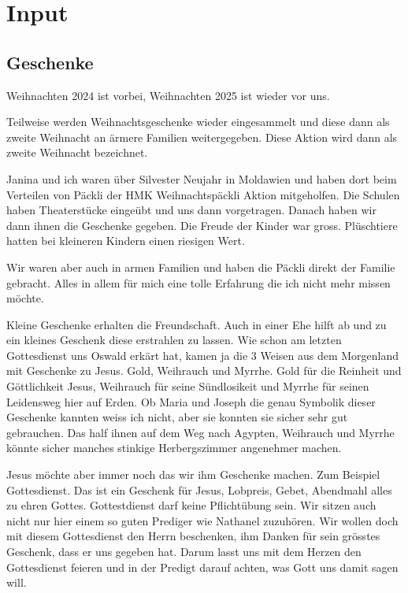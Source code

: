 \section{ Input }
\begin{spacing}{1.5}
\subsection{ Geschenke }

Weihnachten 2024 ist vorbei, Weihnachten 2025 ist wieder vor uns. 

Teilweise werden Weihnachtsgeschenke wieder eingesammelt und diese dann als zweite Weihnacht an ärmere Familien weitergegeben. Diese Aktion wird dann als zweite Weihnacht bezeichnet.

Janina und ich waren über Silvester Neujahr in Moldawien und haben dort beim Verteilen von Päckli der HMK Weihnachtspäckli Aktion mitgeholfen. Die Schulen haben Theaterstücke eingeübt und uns dann vorgetragen. Danach haben wir dann ihnen die Geschenke gegeben. Die Freude der Kinder war gross. Plüschtiere hatten bei kleineren Kindern einen riesigen Wert.

Wir waren aber auch in armen Familien und haben die Päckli direkt der Familie gebracht. Alles in allem für mich eine tolle Erfahrung die ich nicht mehr missen möchte.

Kleine Geschenke erhalten die Freundschaft. Auch in einer Ehe hilft ab und zu ein kleines Geschenk diese erstrahlen zu lassen. Wie schon am letzten Gottesdienst uns Oswald erkärt hat, kamen ja die 3 Weisen aus dem Morgenland mit Geschenke zu Jesus. Gold, Weihrauch und Myrrhe. Gold für die Reinheit und Göttlichkeit Jesus, Weihrauch für seine Sündlosikeit und Myrrhe für seinen Leidensweg hier auf Erden. Ob Maria und Joseph die genau Symbolik dieser Geschenke kannten weiss ich nicht, aber sie konnten sie sicher sehr gut gebrauchen. Das half ihnen auf dem Weg nach Agypten, Weihrauch und Myrrhe könnte sicher manches stinkige Herbergszimmer angenehmer machen.

Jesus möchte aber immer noch das wir ihm Geschenke machen. Zum Beispiel Gottesdienst. Das ist ein Geschenk für Jesus, Lobpreis, Gebet, Abendmahl alles zu ehren Gottes. Gottestdienst darf keine Pflichtübung sein. Wir sitzen auch nicht nur hier einem so guten Prediger wie Nathanel zuzuhören. Wir wollen doch mit diesem Gottesdienst den Herrn beschenken, ihm Danken für sein grösstes Geschenk, dass er uns gegeben hat. Darum lasst uns mit dem Herzen den Gottesdienst feieren und in der Predigt darauf achten, was Gott uns damit sagen will.


\end{spacing}
